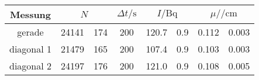 \label{tab:tabWürfel3}
	\begin{tabular}{cS[table-format=5.0]@{${}\pm{}$}S[table-format=3.0]S[table-format=3.0]S[table-format=3.1]@{${}\pm{}$}S[table-format=1.1]S[table-format=1.3]@{${}\pm{}$}S[table-format=1.3]}
		\toprule
		{Messung} &  & {$\Delta t/\si{\second}$} &  &  \\
		\midrule
		{gerade}     & 24141 & 174 & 200 & 120.7 & 0.9 & 0.112 & 0.003 \\
		{diagonal 1} & 21479 & 165 & 200 & 107.4 & 0.9 & 0.103 & 0.003 \\
		{diagonal 2} & 24197 & 176 & 200 & 121.0 & 0.9 & 0.108 & 0.005 \\
		\bottomrule
	\end{tabular}
